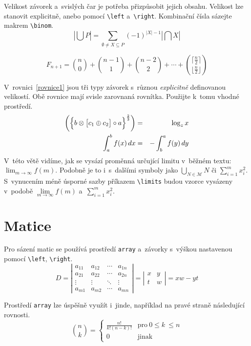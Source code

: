 \documentclass[11pt, twocolumn]{article}[15.03.2024]
\begin{document}
    Velikost závorek a~svislých čar je potřeba přizpůsobit jejich obsahu. Velikost lze stanovit explicitně, anebo pomocí \verb|\left| a~\verb|\right|. Kombinační čísla sázejte makrem \verb|\binom|.
    $$\left|\bigcup P\right|=\sum\limits_{\emptyset \neq X \subseteq P} (-1)^{|X|-1}\left|\bigcap X\right|$$

    $$F_{n+1}=\binom{n}{0}+\binom{n-1}{1}+\binom{n-2}{2}+\cdots+\binom{\lceil\frac{n}{2}\rceil}{\lfloor\frac{n}{2}\rfloor}$$

    V~rovnici~\eqref{rovnice1} jsou tři typy závorek s~různou \emph{explicitně} definovanou velikostí. Obě rovnice mají svisle zarovnaná rovnítka. Použijte k~tomu vhodné prostředí.
    \begin{eqnarray}
        \label{rovnice1}
        \biggl(\Bigl\{b \otimes \bigl[c_1 \oplus c_2\bigr] \circ a\Bigr\}^\frac{2}{3}\biggr) & = & \log_z x\\
        \label{rovnice2}
        \int^b_a f(x)\,dx & = & -\int^a_b f(y)\,dy
    \end{eqnarray}
    V~této větě vidíme, jak se vysází proměnná určující limitu v~běžném textu: $\lim_{m \to \infty} f(m)$. Podobně je to i~s~dalšími symboly jako $\bigcup_{N \in \mathcal{M}} N$ či $\sum^{m}_{i=1} x^{2}_{i}$. S~vynucením méně úsporné sazby příkazem \verb|\limits| budou vzorce vysázeny v~podobě $\lim\limits_{m\to\infty} f(m)$ a~$\sum\limits^{m}_{i=1} x^{2}_{i}$.

\section{Matice}
    Pro sázení matic se používá prostředí \verb|array| a~závorky s~výškou nastavenou pomocí \verb|\left|, \verb|\right|.
    $$
        D = \left|\begin{array}{cccc}
             a_{11} & a_{12} & \cdots & a_{1n} \\
             a_{21} & a_{22} & \cdots & a_{2n} \\
             \vdots & \vdots & \ddots & \vdots \\
             a_{m1} & a_{m2} & \cdots & a_{mn}
        \end{array}\right|=\left|\begin{array}{cc}
             x & y \\
             t & w
        \end{array}\right|=xw - yt
    $$
    
    Prostředí \verb|array| lze úspěšně využít i~jinde, například na pravé straně následující rovnosti.
    $$
        \binom{n}{k}=\left\{\begin{array}{ll}
             \frac{n!}{k!(n-k)!} & \mathrm{pro}\ 0 \leq k~\leq n \\
              0 & \mathrm{jinak}
        \end{array}\right.
    $$
\end{document}
